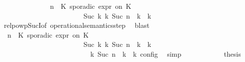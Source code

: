 \begin{isabellebody}
\ \ \ \ \ \ \ \ \ \ \isamarkupfalse%
\ \isamarkupfalse%
\ {\isacartoucheopen}{\isacharparenleft}{\isacharparenleft}{\isasymGamma}{\isacharcomma}\ n\ {\isasymturnstile}\ {\isacharparenleft}{\isacharparenleft}K\ sporadic{\isasymsharp}\ {\isasymtau}\isactrlsub e\isactrlsub x\isactrlsub p\isactrlsub r\ on\ K\ {\isacharhash}\ {\isasymPsi}{\isacharparenright}\ {\isasymtriangleright}\ {\isasymPhi}{\isacharparenright}\isanewline
\ \ \ \ \ \ \ \ \ \ \ \ \ \ \ \ \ \ \ \ \ \ \ \ {\isasymhookrightarrow}\isactrlbsup Suc\ k\isactrlesup \ {\isacharparenleft}{\isasymGamma}\isactrlsub k{\isacharcomma}\ Suc\ n\ {\isasymturnstile}\ {\isasymPsi}\isactrlsub k\ {\isasymtriangleright}\ {\isasymPhi}\isactrlsub k{\isacharparenright}{\isacharparenright}{\isacartoucheclose}\isanewline
\ \ \ \ \ \ \ \ \ \ \ \ \isamarkupfalse%
\ relpowp{\isacharunderscore}Suc{\isacharunderscore}I{}{\isacharbrackleft}of\ {\isacartoucheopen}operational{\isacharunderscore}semantics{\isacharunderscore}step{\isacartoucheclose}{\isacharbrackright}\ \isamarkupfalse%
\ blast\isanewline
\ \ \ \ \ \ \ \ \ \ \isamarkupfalse%
\ {\isacharasterisk}\ \isamarkupfalse%
\ {\isacartoucheopen}{\isacharparenleft}{\isacharparenleft}{\isasymGamma}{\isacharcomma}\ n\ {\isasymturnstile}\ {\isacharparenleft}{\isacharparenleft}K\ sporadic{\isasymsharp}\ {\isasymtau}\isactrlsub e\isactrlsub x\isactrlsub p\isactrlsub r\ on\ K\ {\isacharhash}\ {\isasymPsi}{\isacharparenright}\ {\isasymtriangleright}\ {\isasymPhi}{\isacharparenright}\isanewline
\ \ \ \ \ \ \ \ \ \ \ \ \ \ \ \ \ \ \ \ \ \ \ \ {\isasymhookrightarrow}\isactrlbsup Suc\ k\isactrlesup \ {\isacharparenleft}{\isasymGamma}\isactrlsub k{\isacharcomma}\ Suc\ n\ {\isasymturnstile}\ {\isasymPsi}\isactrlsub k\ {\isasymtriangleright}\ {\isasymPhi}\isactrlsub k{\isacharparenright}{\isacharparenright}\isanewline
\ \ \ \ \ \ \ \ \ \ \ \ \ \ \ \ \ \ \ \ \ \ {\isasymand}\ {\isasymrho}\ {\isasymin}\ {\isasymlbrakk}\ {\isasymGamma}\isactrlsub k{\isacharcomma}\ Suc\ n\ {\isasymturnstile}\ {\isasymPsi}\isactrlsub k\ {\isasymtriangleright}\ {\isasymPhi}\isactrlsub k\ {\isasymrbrakk}\isactrlsub c\isactrlsub o\isactrlsub n\isactrlsub f\isactrlsub i\isactrlsub g{\isacartoucheclose}\ \isamarkupfalse%
\ simp\isanewline
\ \ \ \ \ \ \ \ \ \ \isamarkupfalse%
\ {\isacharquery}thesis\ \isamarkupfalse%

\end{isabellebody}
